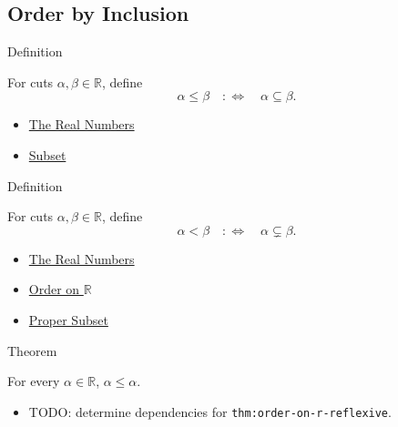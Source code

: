 \subsection*{Order by Inclusion}

\begin{definitionbox}{Definition}
\begin{definition}
\label{def:order-on-r}
For cuts $\alpha,\beta\in\mathbb{R}$, define
\[
\alpha\le\beta \quad:\Longleftrightarrow\quad \alpha\subseteq\beta.
\]
\end{definition}
\end{definitionbox}

\begin{dependencies}
\begin{itemize}
  \item \hyperref[def:reals]{The Real Numbers}
  \item \hyperref[def:subset]{Subset}
\end{itemize}
\end{dependencies}

\begin{definitionbox}{Definition}
\begin{definition}
\label{def:strict-order-on-r}
For cuts $\alpha,\beta\in\mathbb{R}$, define
\[
\alpha<\beta \quad:\Longleftrightarrow\quad \alpha\subsetneq\beta.
\]
\end{definition}
\end{definitionbox}

\begin{dependencies}
\begin{itemize}
  \item \hyperref[def:reals]{The Real Numbers}
  \item \hyperref[def:order-on-r]{Order on $\mathbb{R}$}
  \item \hyperref[def:proper-subset]{Proper Subset}
\end{itemize}
\end{dependencies}

\begin{theorembox}{Theorem}
\begin{theorem}
\label{thm:order-on-r-reflexive}
For every $\alpha\in\mathbb{R}$, $\alpha\le\alpha$.
\end{theorem}
\end{theorembox}

\begin{dependencies}
\begin{itemize}
  \item TODO: determine dependencies for \texttt{thm:order-on-r-reflexive}.
\end{itemize}
\end{dependencies}


